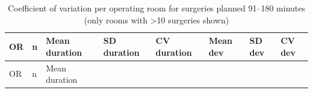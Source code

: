 \documentclass[
]{article}
\begin{document}
\begin{longtable}[]{@{}
  >{\centering\arraybackslash}p{}
  >{\centering\arraybackslash}p{}
  >{\centering\arraybackslash}p{}
  >{\centering\arraybackslash}p{}
  >{\centering\arraybackslash}p{}
  >{\centering\arraybackslash}p{}
  >{\centering\arraybackslash}p{}
  >{\centering\arraybackslash}p{}@{}}
\caption{Coefficient of variation per operating room for surgeries
planned 91--180 minutes (only rooms with \textgreater10 surgeries shown)
\label{tab:cv_room_91_180}}\tabularnewline
\toprule\noalign{}
\begin{minipage}[b]{\linewidth}\centering
OR
\end{minipage} & \begin{minipage}[b]{\linewidth}\centering
n
\end{minipage} & \begin{minipage}[b]{\linewidth}\centering
Mean duration
\end{minipage} & \begin{minipage}[b]{\linewidth}\centering
SD duration
\end{minipage} & \begin{minipage}[b]{\linewidth}\centering
CV duration
\end{minipage} & \begin{minipage}[b]{\linewidth}\centering
Mean dev
\end{minipage} & \begin{minipage}[b]{\linewidth}\centering
SD dev
\end{minipage} & \begin{minipage}[b]{\linewidth}\centering
CV dev
\end{minipage} \\
\midrule\noalign{}
\endfirsthead
\toprule\noalign{}
\begin{minipage}[b]{\linewidth}\centering
OR
\end{minipage} & \begin{minipage}[b]{\linewidth}\centering
n
\end{minipage} & \begin{minipage}[b]{\linewidth}\centering
Mean duration
\end{minipage} & \begin{minipage}[b]{\linewidth}\centering

\end{minipage}
\end{longtable}
\end{document}
